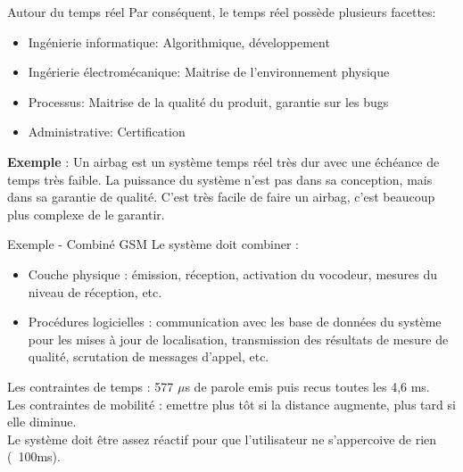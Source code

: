 \begin{frame}{Autour du temps réel}
  Par conséquent, le temps réel possède plusieurs facettes:
  \begin{itemize} 
  \item Ingénierie informatique: Algorithmique, développement
  \item  Ingérierie   électromécanique:  Maitrise  de  l'environnement
    physique
  \item Processus: Maitrise de la qualité du produit, garantie sur les
    bugs
  \item Administrative: Certification
  \end{itemize} 
  \textbf{Exemple} : Un airbag est un système temps réel très dur avec
  une échéance de temps très faible. La puissance du système n'est pas
  dans sa  conception, mais dans  sa garantie de qualité.   C'est très
  facile  de faire  un  airbag,  c'est beaucoup  plus  complexe de  le
  garantir.
\end{frame}


\begin{frame}{Exemple - Combiné GSM}
  Le système doit combiner :
  \begin{itemize}
  \item Couche physique : émission, réception, activation du vocodeur,
    mesures du niveau de réception, etc.
  \item  Procédures  logicielles  :  communication avec  les  base  de
    données  du  système  pour  les  mises  à  jour  de  localisation,
    transmission  des résultats  de mesure  de qualité,  scrutation de
    messages d'appel, etc.
  \end{itemize}

  Les  contraintes de temps  : 577  $\mu$s de  parole emis  puis recus
  toutes les  4,6 ms.\\[3mm]

  Les  contraintes de  mobilité  :  emettre plus  tôt  si la  distance
  augmente,  plus tard si elle diminue.\\[3mm]

  Le  système  doit  être  assez  réactif pour  que  l'utilisateur  ne
  s'appercoive de rien (~100ms).

\end{frame}


